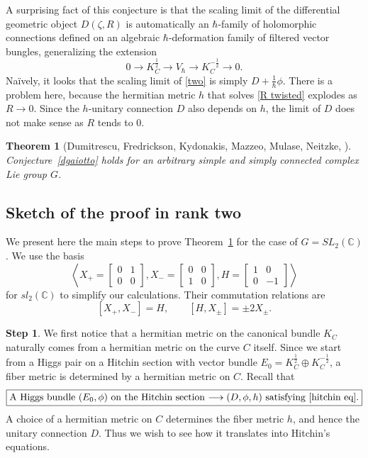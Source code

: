 \documentclass[oneside, 11pt]{amsart}
\newtheorem{thm}{Theorem}[section]
\theoremstyle{definition}
\newtheorem{step}{Step}
\numberwithin{equation}{subsection}
\newcommand{\bC}{{\mathbb{C}}}
\newcommand{\rar}{\rightarrow}
\newcommand{\lrar}{\longrightarrow}
\begin{document}
{A surprising fact of this conjecture is that
the scaling limit of the differential geometric
object $D(\zeta,R)$ is automatically an $\hbar$-family
of 
holomorphic connections defined on an algebraic
$\hbar$-deformation family of filtered
vector bungles, generalizing the extension 
$$0\rightarrow K_C^{\frac{1}{2}}\rightarrow V_\hbar \rightarrow K_C^{-\frac{1}{2}}\rightarrow 0.$$
Na\"ively, it looks that the scaling limit
of \eqref{two} is simply
$D+\frac{1}{\hbar}\phi$. There is a problem here,
because the hermitian metric $h$ that solves
\eqref{R twisted} explodes as $R\rar 0$. 
Since the $h$-unitary connection $D$ 
also depends on $h$, the limit of $D$ does not
make sense as $R$ tends to $0$. 


	




\begin{thm}[Dumitrescu, Fredrickson, Kydonakis, Mazzeo, Mulase, Neitzke, \cite{OD20}]\label{DFKMMN} 
Conjecture~\ref{dgaiotto} holds 
for an arbitrary simple and simply connected complex Lie group $G$.
\end{thm}



\subsection{Sketch of the proof in rank two} We present here the main steps to prove Theorem~\ref{DFKMMN}
for the case of $G=SL_2(\bC)$. We use the basis 
$$
\left<
X_+=\begin{bmatrix}0&1\\0&0
\end{bmatrix},
X_-=\begin{bmatrix}0&0\\1&0
\end{bmatrix},
H=\begin{bmatrix}1&0\\0&-1
\end{bmatrix}
\right>
$$
for $sl_2(\bC)$ to simplify our calculations. 
Their commutation relations are
$$
[X_+,X_-] = H,\qquad [H,X_\pm] = \pm 2X_\pm.
$$

\begin{step}
We first notice that a hermitian metric on 
the canonical bundle $K_C$ naturally comes
from a hermitian metric on the curve $C$ itself. 
Since we start from a Higgs pair on a Hitchin section with vector bundle $E_0=K_C^{\frac{1}{2}}\oplus K_C^{-\frac{1}{2}}$, a fiber metric is determined by a hermitian metric on $C$.  Recall that
$$
\fbox{A Higgs bundle $(E_0, \phi)$ on the Hitchin section   $\lrar   (D, \phi, h)$  satisfying  \eqref{hitchin eq}.}
$$
A choice of a hermitian metric 
on $C$ determines the fiber metric
$h$, and hence the unitary connection $D$. Thus
we wish to see how  it translates into
Hitchin's equations. 
\end{step}

}
\end{document}
